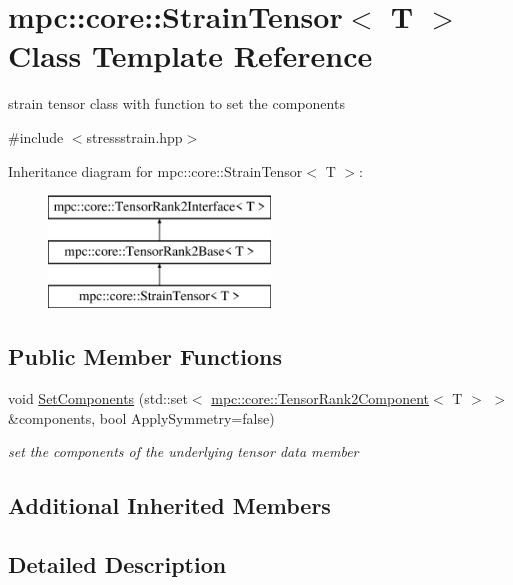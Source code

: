 \hypertarget{structmpc_1_1core_1_1_strain_tensor}{}\section{mpc\+:\+:core\+:\+:Strain\+Tensor$<$ T $>$ Class Template Reference}
\label{structmpc_1_1core_1_1_strain_tensor}


strain tensor class with function to set the components  




{\ttfamily \#include $<$stressstrain.\+hpp$>$}

Inheritance diagram for mpc\+:\+:core\+:\+:Strain\+Tensor$<$ T $>$\+:\begin{figure}[H]
\begin{center}
\leavevmode
\includegraphics[height=3.000000cm]{structmpc_1_1core_1_1_strain_tensor}
\end{center}
\end{figure}
\subsection*{Public Member Functions}
\begin{DoxyCompactItemize}
\item 
void \mbox{\hyperlink{structmpc_1_1core_1_1_strain_tensor_a9e208aa77d77296f5fc6fdadd76b018f}{Set\+Components}} (std\+::set$<$ \mbox{\hyperlink{namespacempc_1_1core_a467e1fa517a8c269b033fef3aa281360}{mpc\+::core\+::\+Tensor\+Rank2\+Component}}$<$ T $>$ $>$ \&components, bool Apply\+Symmetry=false)
\begin{DoxyCompactList}\small\item\em set the components of the underlying tensor data member \end{DoxyCompactList}\end{DoxyCompactItemize}
\subsection*{Additional Inherited Members}


\subsection{Detailed Description}
